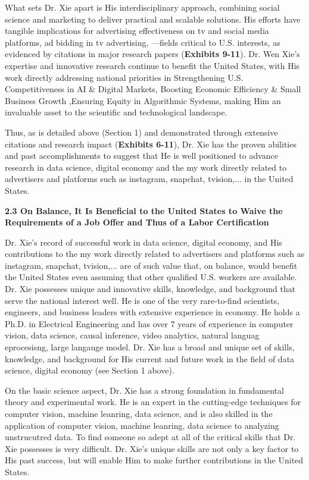 \documentclass{article}
\begin{document}
What sets Dr. Xie apart is His interdisciplinary approach, combining social science and marketing to deliver practical and scalable solutions. His efforts have tangible implications for advertising effectiveness on tv and social media platforms, ad bidding in tv advertising, —fields critical to U.S. interests, as evidenced by citations in major research papers (\textbf{Exhibits 9-11}). Dr. Wen Xie's expertise and innovative research continue to benefit the United States, with His work directly addressing national priorities in Strengthening U.S. Competitiveness in AI \& Digital Markets, Boosting Economic Efficiency \& Small Business Growth ,Ensuring Equity in Algorithmic Systems, making Him an invaluable asset to the scientific and technological landscape.

Thus, as is detailed above (Section 1) and demonstrated through extensive citations and research impact (\textbf{Exhibits 6-11}), Dr. Xie has the proven abilities and past accomplishments to suggest that He is well positioned to advance research in data science, digital economy and the my work directly related to advertisers and platforms such as instagram, snapchat, tvision,... in the United States.



{\bf 2.3 On Balance, It Is Beneficial to the United States to Waive the Requirements of a Job Offer and Thus of a Labor Certification}

Dr. Xie's record of successful work in data science, digital economy, and His contributions to the my work directly related to advertisers and platforms such as instagram, snapchat, tvision,... are of such value that, on balance, would benefit the United States even assuming that other qualified U.S. workers are available. Dr. Xie possesses unique and innovative skills, knowledge, and background that serve the national interest well. He is one of the very rare-to-find scientists, engineers, and business leaders with extensive experience in economy. He holds a Ph.D. in Electrical Engineering and has over 7 years of experience in computer vision, data science, causal inference, video analytics, natural languag eprocesisng, large langauge model. Dr. Xie has a broad and unique set of skills, knowledge, and background for His current and future work in the field of data science, digital economy (see Section 1 above).

On the basic science aspect, Dr. Xie has a strong foundation in fundamental theory and experimental work. He is an expert in the cutting-edge techniques for computer vision, machine leanring, data science, and is also skilled in the application of computer vision, machine leanring, data science to analyzing unstrucutred data. To find someone so adept at all of the critical skills that Dr. Xie possesses is very difficult. Dr. Xie's unique skills are not only a key factor to His past success, but will enable Him to make further contributions in the United States.
\end{document}
